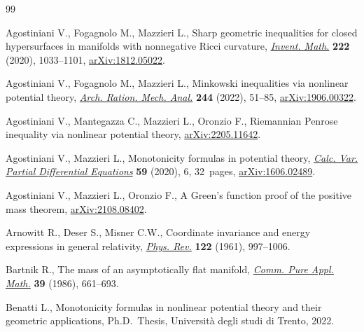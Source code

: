 \documentclass[10pt,a4paper]{amsart}
\numberwithin{equation}{section}
\begin{document}
\begin{thebibliography}{99}
\footnotesize\itemsep=0pt

Agostiniani V., Fogagnolo M., Mazzieri L., Sharp geometric inequalities for
 closed hypersurfaces in manifolds with nonnegative {R}icci curvature,
 \href{https://doi.org/10.1007/s00222-020-00985-4}{\textit{Invent. Math.}} \textbf{222} (2020), 1033--1101, \href{https://arxiv.org/abs/1812.05022}{arXiv:1812.05022}.

Agostiniani V., Fogagnolo M., Mazzieri L., Minkowski inequalities via nonlinear
 potential theory, \href{https://doi.org/10.1007/s00205-022-01756-6}{\textit{Arch. Ration. Mech. Anal.}} \textbf{244} (2022),
 51--85, \href{https://arxiv.org/abs/1906.00322}{arXiv:1906.00322}.

Agostiniani V., Mantegazza C., Mazzieri L., Oronzio F., Riemannian {P}enrose
 inequality via nonlinear potential theory, \href{https://arxiv.org/abs/2205.11642}{arXiv:2205.11642}.

Agostiniani V., Mazzieri L., Monotonicity formulas in potential theory,
 \href{https://doi.org/10.1007/s00526-019-1665-2}{\textit{Calc. Var. Partial Differential Equations}} \textbf{59} (2020), 6,
 32~pages, \href{https://arxiv.org/abs/1606.02489}{arXiv:1606.02489}.

Agostiniani V., Mazzieri L., Oronzio F., A {G}reen's function proof of the
 positive mass theorem, \href{https://arxiv.org/abs/2108.08402}{arXiv:2108.08402}.

Arnowitt R., Deser S., Misner C.W., Coordinate invariance and energy
 expressions in general relativity, \href{https://doi.org/10.1103/PhysRev.122.997}{\textit{Phys. Rev.}} \textbf{122} (1961),
 997--1006.

Bartnik R., The mass of an asymptotically flat manifold, \href{https://doi.org/10.1002/cpa.3160390505}{\textit{Comm. Pure
 Appl. Math.}} \textbf{39} (1986), 661--693.

Benatti L., Monotonicity formulas in nonlinear potential theory and their
 geometric applications, Ph.D.~Thesis, {U}niversit\`a degli studi di Trento,
 2022.


\end{thebibliography}
\end{document}
